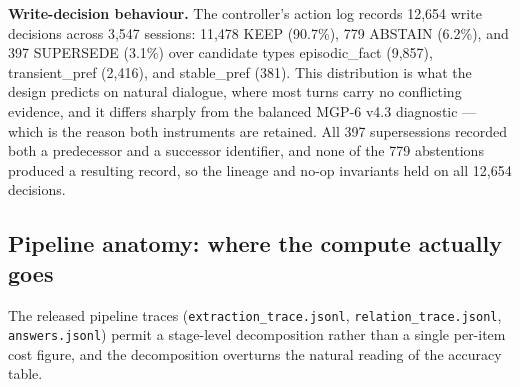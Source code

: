 \textbf{Write-decision behaviour.} The controller's action log records
12,654 write decisions across 3,547 sessions: 11,478 KEEP (90.7\%), 779
ABSTAIN (6.2\%), and 397 SUPERSEDE (3.1\%) over candidate types
episodic\_fact (9,857), transient\_pref (2,416), and stable\_pref (381).
This distribution is what the design predicts on natural dialogue, where
most turns carry no conflicting evidence, and it differs sharply from
the balanced MGP-6 v4.3 diagnostic --- which is the reason both
instruments are retained. All 397 supersessions recorded both a
predecessor and a successor identifier, and none of the 779 abstentions
produced a resulting record, so the lineage and no-op invariants held on
all 12,654 decisions.

\subsection{Pipeline anatomy: where the compute actually
goes}\label{pipeline-anatomy-where-the-compute-actually-goes}

The released pipeline traces (\texttt{extraction\_trace.jsonl},
\texttt{relation\_trace.jsonl}, \texttt{answers.jsonl}) permit a
stage-level decomposition rather than a single per-item cost figure, and
the decomposition overturns the natural reading of the accuracy table.

